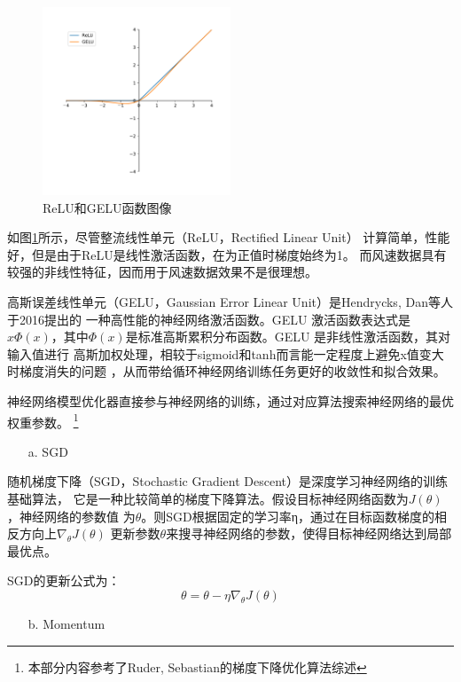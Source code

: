 \documentclass[AutoFakeBold]{LZUThesis}
\begin{document}
\begin{figure}[H]
	\centering
    \includegraphics[width=0.5\textwidth]{figures/relu_gelu.pdf}
    \caption{ReLU和GELU函数图像}
    \label{fig_relu_gelu}
\end{figure}

如图\ref{fig_relu_gelu}所示，尽管整流线性单元（ReLU，Rectified Linear Unit）
计算简单，性能好，但是由于ReLU是线性激活函数，在为正值时梯度始终为1。
而风速数据具有较强的非线性特征，因而用于风速数据效果不是很理想。

高斯误差线性单元（GELU，Gaussian Error Linear Unit）是Hendrycks, Dan等人于2016提出的
一种高性能的神经网络激活函数。GELU 激活函数表达式是
$x\Phi(x)$，其中$\Phi(x)$是标准高斯累积分布函数。GELU 是非线性激活函数，其对输入值进行
高斯加权处理，相较于sigmoid和tanh而言能一定程度上避免x值变大时梯度消失的问题
，从而带给循环神经网络训练任务更好的收敛性和拟合效果。

神经网络模型优化器直接参与神经网络的训练，通过对应算法搜索神经网络的最优权重参数。
\footnote{本部分内容参考了Ruder, Sebastian的梯度下降优化算法综述}
\begin{itemize}
    \item[a. ] SGD
\end{itemize}

随机梯度下降（SGD，Stochastic Gradient Descent）是深度学习神经网络的训练基础算法，
它是一种比较简单的梯度下降算法。假设目标神经网络函数为$J(\theta)$，神经网络的参数值
为$\theta$。则SGD根据固定的学习率η，通过在目标函数梯度的相反方向上$\nabla_\theta J( \theta)$
更新参数$\theta$来搜寻神经网络的参数，使得目标神经网络达到局部最优点。

SGD的更新公式为：
$$\theta = \theta - \eta\nabla_\theta J( \theta)$$

\begin{itemize}
    \item[b. ] Momentum
\end{itemize}
\end{document}
